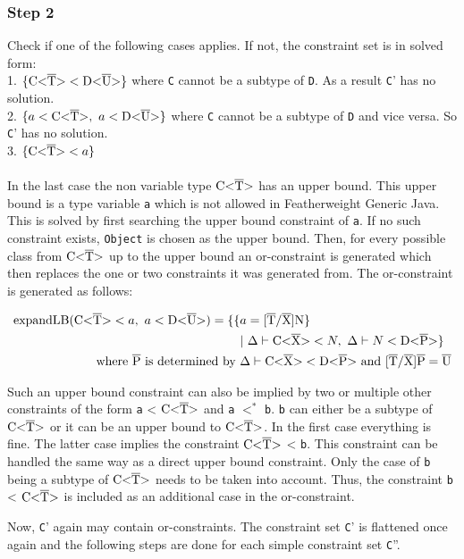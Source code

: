 \subsubsection{Step 2}
Check if one of the following cases applies. If not, the constraint set is in solved form:\\
1. $\{ \text{C<}\overline{\text{T}}\text{>} < \text{D<}\overline{\text{U}}\text{>} \}$ where \verb|C| cannot be a subtype of \verb|D|. As a result \verb|C|' has no solution.\\
2. $\{ a < \text{C<}\overline{\text{T}}\text{>}, \ a < \text{D<}\overline{\text{U}}\text{>} \}$ where \verb|C| cannot be a subtype of \verb|D| and vice versa. So \verb|C|' has no solution.\\
3. $\{ \text{C<}\overline{\text{T}}\text{>} < a \}$\\
\\
In the last case the non variable type $\text{C<}\overline{\text{T}}\text{>}$ has an upper bound. This upper bound is a type variable \verb|a| which is not allowed in Featherweight Generic Java.
This is solved by first searching the upper bound constraint of \verb|a|. If no such constraint exists, \verb|Object| is chosen as the upper bound. Then, for every possible class
from $\text{C<}\overline{\text{T}}\text{>}$ up to the upper bound an or-constraint is generated which then replaces the one or two constraints it was generated from.
The or-constraint is generated as follows:

\begin{align*}
    \text{expandLB} ( \text{C<}\overline{\text{T}}\text{>} < a, \ a < \text{D<}\overline{\text{U}}\text{>} ) = \{ \{ &a = \text{[}\overline{\text{T}}/\overline{\text{X}}\text{]N} \} \\
     &| \ \Delta \vdash \text{C<}\overline{\text{X}}\text{>} < N, \ \Delta \vdash N < \text{D<}\overline{\text{P}}\text{>} \}\\
    \text{where} \ \overline{\text{P}} \ \text{is determined by } & \Delta \vdash \text{C<}\overline{\text{X}}\text{>} < \text{D<}\overline{\text{P}}\text{>} \ \text{and} \ \text{[}\overline{\text{T}}/\overline{\text{X}}\text{]}\overline{\text{P}} = \overline{\text{U}}\\
\end{align*}

Such an upper bound constraint can also be implied by two or multiple other constraints of the form \verb|a| < $\text{C<}\overline{\text{T}}\text{>}$ and \verb|a| $<^*$ \verb|b|. \verb|b| can either be a subtype of $\text{C<}\overline{\text{T}}\text{>}$ or it can be an upper bound to $\text{C<}\overline{\text{T}}\text{>}$. In the first case everything is fine.
The latter case implies the constraint $\text{C<}\overline{\text{T}}\text{>}$ < \verb|b|. This constraint can be handled the same way as a direct upper bound constraint. Only the case of \verb|b| being a subtype of $\text{C<}\overline{\text{T}}\text{>}$ needs to be taken into account. Thus, the constraint \verb|b| < $\text{C<}\overline{\text{T}}\text{>}$ is included as an additional case in the or-constraint.

Now, \verb|C|' again may contain or-constraints. The constraint set \verb|C|' is flattened once again and the following steps are done for each simple constraint set \verb|C|''.

